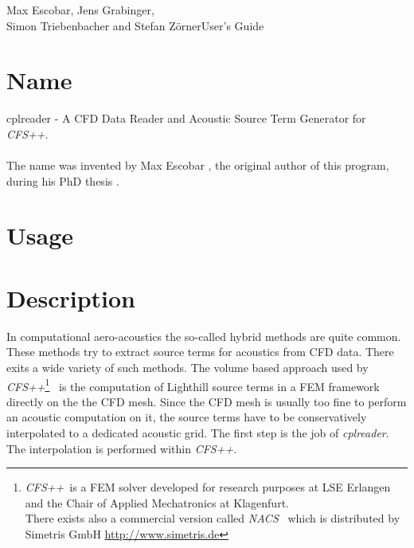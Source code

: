 \documentclass[a4paper,10pt]{article}
\begin{document}

    {Max Escobar, Jens Grabinger,\\\vspace{2mm}
      Simon Triebenbacher and Stefan Zörner\vspace{2mm}}{User's Guide}

\newcommand{\figref}[1]{Fig.~\ref{fig:#1}}
\newcommand{\eqnref}[1]{Eq.~(\ref{eq:#1})}
\newcommand{\cfs}{\textit{CFS++}}
\newcommand{\nacs}{\textit{NACS}}
\newcommand{\cplreader}{\textit{cplreader}}
\newcommand{\hdf}{\textit{HDF5}}
\newcommand{\CFX}{\textit{ANSYS CFX}}
\newcommand{\OpenFOAM}{\textit{OpenFOAM}}
\newcommand{\FASTEST}{\textit{FASTEST-3D}}
\newcommand{\ANSYS}{\textit{ANSYS}}



\tableofcontents

\newpage
\section{Name}
cplreader  - A  CFD Data  Reader and  Acoustic Source  Term  Generator for
\cfs.\\\\ The  name was invented by  Max Escobar , the  original author of
this program, during his PhD thesis \cite{Escobar2007}.

\newpage
\section{Usage}

\newpage
\section{Description}
In  computational aero-acoustics  the so-called  hybrid methods  are quite
common.  These methods try to  extract source terms for acoustics from CFD
data.   There exits  a wide  variety of  such methods.   The  volume based
approach  used  by \cfs\footnote{\cfs\,  is  a  FEM  solver developed  for
  research purposes at LSE Erlangen  and the Chair of Applied Mechatronics
  at Klagenfurt.\\  There exists also  a commercial version  called \nacs~
  which  is distributed  by  Simetris GmbH  \url{http://www.simetris.de}}~
\cite{Kaltenbacher2005a} is the computation of Lighthill source terms in a
FEM framework directly on the the  CFD mesh. Since the CFD mesh is usually
too fine to  perform an acoustic computation on it,  the source terms have
to be conservatively interpolated to a dedicated acoustic grid.  The first
step is the job of \cplreader. The interpolation is performed within \cfs.
\end{document}
